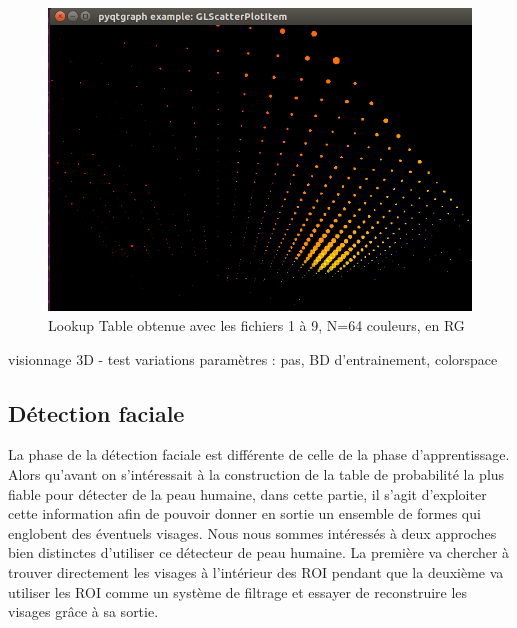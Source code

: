 \documentclass[a4paper,11pt]{article}
\begin{document}
\begin{figure}[H]
\begin{center}
    \includegraphics[scale=0.5]{lT_1_9_4_RG.png}
    \caption{Lookup Table obtenue avec les fichiers 1 à 9, N=64 couleurs, en RG}
\end{center}
\end{figure}

visionnage 3D
- test variations paramètres : pas, BD d'entrainement, colorspace

\subsection{Détection faciale}

La phase de la détection faciale est différente de celle de la phase d'apprentissage. 
Alors qu'avant on s'intéressait à la construction de la table de probabilité la plus fiable pour détecter de la peau humaine, dans cette partie, il s'agit d'exploiter cette information afin de pouvoir donner en sortie un ensemble de formes qui englobent des éventuels visages.
Nous nous sommes intéressés à deux approches bien distinctes d'utiliser ce \og détecteur de peau humaine\fg{}. 
La première va chercher à trouver directement les visages à l'intérieur des ROI pendant que la deuxième va utiliser les ROI comme un système de filtrage et essayer de reconstruire les visages grâce à sa sortie.
\newline
\end{document}
